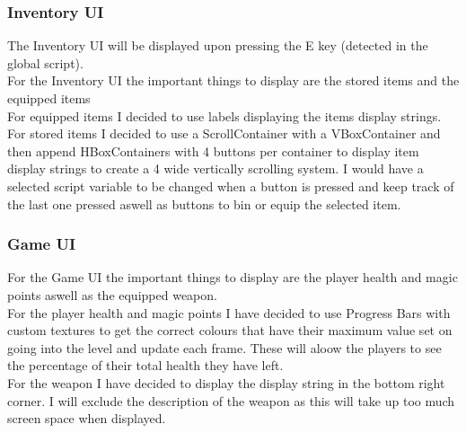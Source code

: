 \documentclass{article}
\begin{document}
        \subsubsection{Inventory UI}
        The Inventory UI will be displayed upon pressing the E key (detected in the global script).\\
        For the Inventory UI the important things to display are the stored items and the equipped items\\
        For equipped items I decided to use labels displaying the items display strings.\\
        For stored items I decided to use a ScrollContainer with a VBoxContainer and then append HBoxContainers with 4 buttons per container to display item display strings to create a 4 wide vertically scrolling system. I would have a selected script variable to be changed when a button is pressed and keep track of the last one pressed aswell as buttons to bin or equip the selected item.\\
        \subsubsection{Game UI}
        For the Game UI the important things to display are the player health and magic points aswell as the equipped weapon.\\
        For the player health and magic points I have decided to use Progress Bars with custom textures to get the correct colours that have their maximum value set on going into the level and update each frame. These will aloow the players to see the percentage of their total health they have left.\\
        For the weapon I have decided to display the display string in the bottom right corner. I will exclude the description of the weapon as this will take up too much screen space when displayed.\\
\end{document}
